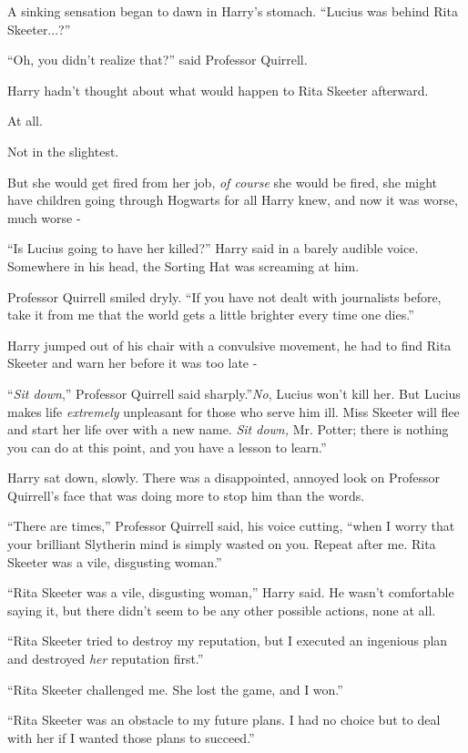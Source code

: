A sinking sensation began to dawn in Harry's stomach. ``Lucius was
behind Rita Skeeter...?''

``Oh, you didn't realize that?'' said Professor Quirrell.

Harry hadn't thought about what would happen to Rita Skeeter afterward.

At all.

Not in the slightest.

But she would get fired from her job, \emph{of course} she would be
fired, she might have children going through Hogwarts for all Harry
knew, and now it was worse, much worse -

``Is Lucius going to have her killed?'' Harry said in a barely audible
voice. Somewhere in his head, the Sorting Hat was screaming at him.

Professor Quirrell smiled dryly. ``If you have not dealt with
journalists before, take it from me that the world gets a little
brighter every time one dies.''

Harry jumped out of his chair with a convulsive movement, he had to find
Rita Skeeter and warn her before it was too late -

``\emph{Sit down},'' Professor Quirrell said sharply.''\emph{No}, Lucius
won't kill her. But Lucius makes life \emph{extremely} unpleasant for
those who serve him ill. Miss Skeeter will flee and start her life over
with a new name. \emph{Sit down,} Mr. Potter; there is nothing you can
do at this point, and you have a lesson to learn.''

Harry sat down, slowly. There was a disappointed, annoyed look on
Professor Quirrell's face that was doing more to stop him than the
words.

``There are times,'' Professor Quirrell said, his voice cutting, ``when
I worry that your brilliant Slytherin mind is simply wasted on you.
Repeat after me. Rita Skeeter was a vile, disgusting woman.''

``Rita Skeeter was a vile, disgusting woman,'' Harry said. He wasn't
comfortable saying it, but there didn't seem to be any other possible
actions, none at all.

``Rita Skeeter tried to destroy my reputation, but I executed an
ingenious plan and destroyed \emph{her} reputation first.''

``Rita Skeeter challenged me. She lost the game, and I won.''

``Rita Skeeter was an obstacle to my future plans. I had no choice but
to deal with her if I wanted those plans to succeed.''

